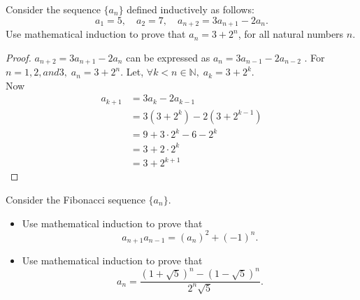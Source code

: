 \documentclass[12pt]{article}
\newenvironment{problem}[2][Problem]{\begin{trivlist}
\item[\hskip \labelsep {\bfseries #1}\hskip \labelsep {\bfseries #2.}]}{\end{trivlist}}
\begin{document}
\begin{problem}{12}
Consider the sequence \( \{a_n\} \) defined inductively as follows:
\[
a_1 = 5, \quad a_2 = 7, \quad a_{n+2} = 3a_{n+1} - 2a_n.
\]
Use mathematical induction to prove that \( a_n = 3 + 2^n \), for all natural numbers \( n \).

\end{problem}

\begin{proof}
$a_{n+2} = 3a_{n+1} - 2a_n$ can be expressed as $a_n = 3a_{n-1} - 2a_{n-2}$ .
For $n = 1, 2, and 3, \; a_n = 3 + 2^n$. Let, $\forall k < n \in \mathbb{N}, \; a_k = 3 + 2^k$. \\
Now
\begin{align*}
a_{k+1} & = 3a_k - 2a_{k-1} \\
& = 3(3+2^k) - 2(3+2^{k-1}) \\
& = 9 + 3\cdot 2^k - 6 - 2^k \\
& = 3 + 2\cdot 2^k \\
& = 3 + 2^{k+1}
\end{align*}

\end{proof}

\begin{problem}{13}
Consider the Fibonacci sequence \( \{a_n\} \).

\begin{itemize}
    \item[(a)] Use mathematical induction to prove that
    \[
    a_{n+1} a_{n-1} = (a_n)^2 + (-1)^n.
    \]
    
    \item[(b)] Use mathematical induction to prove that
    \[
    a_n = \frac{(1 + \sqrt{5})^n - (1 - \sqrt{5})^n}{2^n \sqrt{5}}.
    \]
\end{itemize}

\end{problem}
\end{document}
